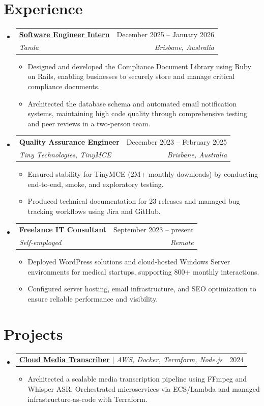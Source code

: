 \documentclass[a4paper,11pt]{article}
\makeatletter
\newcommand{\resumeItem}[1]{
  \item\small{
    {#1 \vspace{-2pt}}
  }
}
\newcommand{\resumeSubheading}[4]{
  \vspace{-2pt}\item
    \begin{tabular*}{0.97\textwidth}[t]{l@{\extracolsep{\fill}}r}
      \textbf{#1} & #2 \\
      \textit{\small#3} & \textit{\small #4} \\
    \end{tabular*}\vspace{-7pt}
}
\newcommand{\resumeProjectHeading}[2]{
    \item
    \begin{tabular*}{0.97\textwidth}{l@{\extracolsep{\fill}}r}
      \small#1 & #2 \\
    \end{tabular*}\vspace{-7pt}
}
\newcommand{\resumeSubHeadingListStart}{\begin{itemize}[leftmargin=0.15in, label={}]}
\newcommand{\resumeSubHeadingListEnd}{\end{itemize}}
\newcommand{\resumeItemListStart}{\begin{itemize}}
\newcommand{\resumeItemListEnd}{\end{itemize}\vspace{-5pt}}
\makeatother
\begin{document}
\section{Experience}
  \resumeSubHeadingListStart

    \resumeSubheading
        {\href{https://farzadhayat.dev/posts/tanda-internship/}{Software Engineer Intern}}{December 2025 -- January 2026}
        {Tanda}{Brisbane, Australia}
        \resumeItemListStart
            \resumeItem{Designed and developed the Compliance Document Library using Ruby on Rails, enabling businesses to securely store and manage critical compliance documents.}
            \resumeItem{Architected the database schema and automated email notification systems, maintaining high code quality through comprehensive testing and peer reviews in a two-person team.}
        \resumeItemListEnd

    \resumeSubheading
        {Quality Assurance Engineer}{December 2023 -- February 2025}
        {Tiny Technologies, TinyMCE}{Brisbane, Australia}
        \resumeItemListStart
            \resumeItem{Ensured stability for TinyMCE (2M+ monthly downloads) by conducting end-to-end, smoke, and exploratory testing.}
            \resumeItem{Produced technical documentation for 23 releases and managed bug tracking workflows using Jira and GitHub.}
        \resumeItemListEnd

    \resumeSubheading
        {Freelance IT Consultant}{September 2023 -- present}
        {Self-employed}{Remote}
        \resumeItemListStart
            \resumeItem{Deployed WordPress solutions and cloud-hosted Windows Server environments for medical startups, supporting 800+ monthly interactions.}
            \resumeItem{Configured server hosting, email infrastructure, and SEO optimization to ensure reliable performance and visibility.}
        \resumeItemListEnd

  \resumeSubHeadingListEnd


\section{Projects}
    \resumeSubHeadingListStart
        \resumeProjectHeading
            {\textbf{\href{https://farzadhayat.dev/posts/cloud-transcriber/}{Cloud Media Transcriber}} $|$ \emph{AWS, Docker, Terraform, Node.js}}{2024}
        \resumeItemListStart
            \resumeItem{Architected a scalable media transcription pipeline using FFmpeg and Whisper ASR. Orchestrated microservices via ECS/Lambda and managed infrastructure-as-code with Terraform.}
        \resumeItemListEnd
    \resumeSubHeadingListEnd
\end{document}
